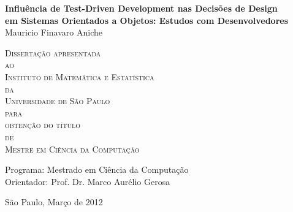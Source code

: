\documentclass[11pt,openany,twoside,a4paper]{book}
\begin{document}
\frontmatter 
\fancyhead[RO]{{\footnotesize\rightmark}\hspace{2em}\thepage}
\setcounter{tocdepth}{2}
\fancyhead[LE]{\thepage\hspace{2em}\footnotesize{\leftmark}}
\fancyhead[RE,LO]{}
\fancyhead[RO]{{\footnotesize\rightmark}\hspace{2em}\thepage}

\onehalfspacing  %

\thispagestyle{empty}
\begin{center}
    \vspace*{2.3cm}
    \textbf{\Large{Influência de Test-Driven Development nas Decisões de Design \\
	em Sistemas Orientados a Objetos: Estudos com Desenvolvedores}}\\
    
    \vspace*{1.2cm}
    \Large{Mauricio Finavaro Aniche}
    
    \vskip 2cm
    \textsc{
    Dissertação apresentada\\[-0.25cm] 
    ao\\[-0.25cm]
    Instituto de Matemática e Estatística\\[-0.25cm]
    da\\[-0.25cm]
    Universidade de São Paulo\\[-0.25cm]
    para\\[-0.25cm]
    obtenção do título\\[-0.25cm]
    de\\[-0.25cm]
    Mestre em Ciência da Computação}
    
    \vskip 1.5cm
    Programa: Mestrado em Ciência da Computação\\
    Orientador: Prof. Dr. Marco Aurélio Gerosa

   	\vskip 1.5cm
    \normalsize{São Paulo, Março de 2012}
\end{center}

\end{document}
